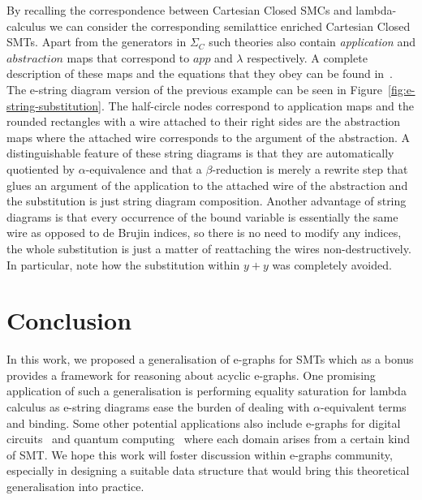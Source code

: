 \documentclass[sigconf, 9pt, nonacm]{acmart}
\begin{document}
By recalling the correspondence between Cartesian Closed SMCs and lambda-calculus we can consider the corresponding semilattice enriched Cartesian Closed SMTs.
Apart from the generators in $\Sigma_{C}$ such theories also contain \textit{application} and $\textit{abstraction}$ maps that correspond to $app$ and $\lambda$ respectively.
A complete description of these maps and the equations that they obey can be found in~\cite{ghica-zanassi2023string}.
The e-string diagram version of the previous example can be seen in Figure~\ref{fig:e-string-substitution}.
The half-circle nodes correspond to application maps and the rounded rectangles with a wire attached to their right sides are the abstraction maps where the attached wire corresponds to the argument of the abstraction.
A distinguishable feature of these string diagrams is that they are automatically quotiented by $\alpha$-equivalence and that a $\beta$-reduction is merely a rewrite step that glues an argument of the application to the attached wire of the abstraction and the substitution is just string diagram composition.
Another advantage of string diagrams is that every occurrence of the bound variable is essentially the same wire as opposed to de Brujin indices, so there is no need to modify any indices, the whole substitution is just a matter of reattaching the wires non-destructively.
In particular, note how the substitution within $y + y$ was completely avoided.

\section{Conclusion}

In this work, we proposed a generalisation of e-graphs for SMTs which as a bonus provides a framework for reasoning about acyclic e-graphs.
One promising application of such a generalisation is performing equality saturation for lambda calculus as e-string diagrams ease the burden of dealing with $\alpha$-equivalent terms and binding.
Some other potential applications also include e-graphs for digital circuits~\cite{ghica_compositional_2023} and quantum computing~\cite{coecke_interacting_2011} where each domain arises from a certain kind of SMT.
We hope this work will foster discussion within e-graphs community, especially in designing a suitable data structure that would bring this theoretical generalisation into practice.



\end{document}
